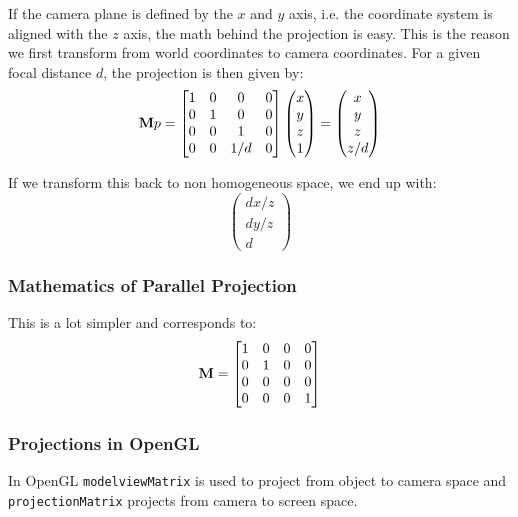 If the camera plane is defined by the $x$ and $y$ axis, i.e. the coordinate system is aligned with the $z$ axis, the math behind the projection is easy. This is the reason we first transform from world coordinates to camera coordinates. For a given focal distance $d$, the projection is then given by:
$$\textbf M p = \begin{bmatrix}
	1 & 0 & 0 & 0 \\
	0 & 1 & 0 & 0 \\
	0 & 0 & 1 & 0 \\
	0 & 0 & 1/d & 0
\end{bmatrix} \begin{pmatrix}
	x \\ y \\ z \\ 1
\end{pmatrix} = \begin{pmatrix}
	x \\ y \\ z \\ z / d
\end{pmatrix}$$

If we transform this back to non homogeneous space, we end up with:
$$\begin{pmatrix}
	dx / z \\ dy / z \\ d
\end{pmatrix}$$

\subsubsection{Mathematics of Parallel Projection}

This is a lot simpler and corresponds to:
$$\textbf M = \begin{bmatrix}
	1 & 0 & 0 & 0 \\
	0 & 1 & 0 & 0 \\
	0 & 0 & 0 & 0 \\
	0 & 0 & 0 & 1
\end{bmatrix}$$

\subsubsection{Projections in OpenGL}

In OpenGL \texttt{modelviewMatrix} is used to project from object to camera space and \texttt{projectionMatrix} projects from camera to screen space.



